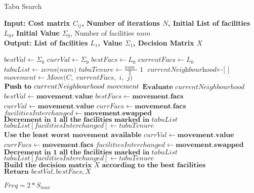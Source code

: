 \documentclass{article}
\begin{document}
    
    \begin{algorithm}
    \caption{Tabu Search}\label{helper}
    \hspace*{\algorithmicindent} \textbf{Input: Cost matrix $C_{ij}$, Number of iterations $N$, Initial List of facilities $L_0$, Initial Value $\Sigma_0$}, Number of facilities $num$\\
    \hspace*{\algorithmicindent} \textbf{Output: List of facilities $L_1$, Value $\Sigma_1$, Decision Matrix $X$} 
    \begin{algorithmic}[1]
    \State $\textit{$bestVal$} \gets \textit{$\Sigma_0$}$
    \State $\textit{$currVal$} \gets \textit{$\Sigma_0$}$
    \State $\textit{$bestFacs$} \gets \textit{$L_0$}$
    \State $\textit{$currentFacs$} \gets \textit{$L_0$}$
    \State $\textit{$tabuList$} \gets \textit{zeros($num$)}$
    \State $\textit{$tabuTenure$} \gets \textit{$\frac{num}{2}$- 1}$
        \State $\textit{currentNeighbourhood} \gets \textit{[ ]}$
            \State $\textit{$movement$} \gets \textit{$Move($C$, $ currentFacs$, $ i$, $ j$)$}$
            \State $\textbf{Push to $currentNeighbourhood$ $ movement$}$
            \EndFor
        \EndFor
        \State $\textbf{Evaluate $currentNeighbourhood$}$
            \State $\textit{$bestVal$} \gets \textbf{movement.value}$
            \State $\textit{$bestFacs$} \gets \textbf{movement.facs}$
            \State $\textit{$currVal$} \gets \textbf{movement.value}$
            \State $\textit{$currFacs$} \gets \textbf{movement.facs}$
            \State $\textit{$facilitiesInterchanged$} \gets \textbf{movement.swapped}$
            \State $\textbf{Decrement in 1 all the facilities marked in $tabuList$}$
            \State $\textit{$tabuList[facilitiesInterchanged]$} \gets \textit{$tabuTenure$}$
        \Else{}
            \State $\textbf{Use the least worst movement available}$
            \State $\textit{$currVal$} \gets \textbf{movement.value}$
            \State $\textit{$currFacs$} \gets \textbf{movement.facs}$
            \State $\textit{$facilitiesInterchanged$} \gets \textbf{movement.swapped}$
            \State $\textbf{Decrement in 1 all the facilities marked in $tabuList$}$
            \State $\textit{$tabuList[facilitiesInterchanged]$} \gets \textit{$tabuTenure$}$
        \EndIf
    \EndFor
    \State $\textbf{Build the decision matrix $X$ according to the best facilities}$
    \State $\textbf{Return $bestVal, bestFacs, X$}$
    \EndProcedure
    \end{algorithmic}
    \end{algorithm}
    
    $Freq = 2 * S_{max}$
    
    
    
    
    
\end{document}
